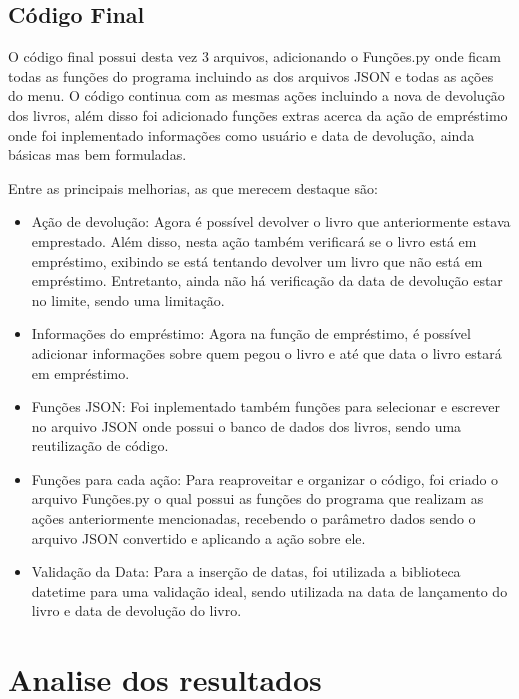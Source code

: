\documentclass[12pt]{article}
\begin{document}
        \subsection{Código Final}

        O código final possui desta vez 3 arquivos, adicionando o Funções.py onde ficam todas as funções do programa incluindo as dos arquivos JSON e todas as ações do menu. O código continua com as mesmas ações incluindo a nova de devolução dos livros, além disso
        foi adicionado funções extras acerca da ação de empréstimo onde foi inplementado informações como usuário e data de devolução, ainda básicas mas bem formuladas. 

            Entre as principais melhorias, as que merecem destaque são:
        \begin{itemize}
            \item Ação de devolução: Agora é possível devolver o livro que anteriormente estava emprestado. Além disso, nesta ação também verificará se o livro está em empréstimo, exibindo se está tentando devolver um livro que não está em empréstimo. Entretanto, ainda não há verificação da data de devolução estar no limite, sendo uma limitação.

            \item Informações do empréstimo: Agora na função de empréstimo, é possível adicionar informações sobre quem pegou o livro e até que data o livro estará em empréstimo.

            \item Funções JSON: Foi inplementado também funções para selecionar e escrever no arquivo JSON onde possui o banco de dados dos livros, sendo uma reutilização de código. 

            \item Funções para cada ação: Para reaproveitar e organizar o código, foi criado o arquivo Funções.py o qual possui as funções do programa que realizam as ações anteriormente mencionadas, recebendo o parâmetro dados sendo o arquivo JSON convertido e aplicando a ação sobre ele.

            \item Validação da Data: Para a inserção de datas, foi utilizada a biblioteca datetime para uma validação ideal, sendo utilizada na data de lançamento do livro e data de devolução do livro.
        \end{itemize}

        
        

    \section{Analise dos resultados}
\end{document}
